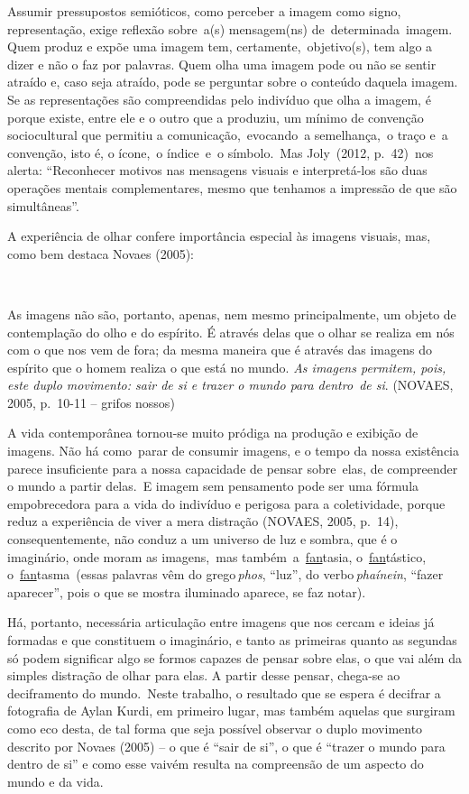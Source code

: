 \documentclass[
  letterpaper,
  a4paper,
  12pt]{scrbook}
\renewenvironment{quote}
  {\par\singlespacing\small\list{}{\rightmargin=0cm \leftmargin=4cm}%
   \item\relax}
  {\endlist}
\begin{document}
Assumir pressupostos semióticos, como perceber a imagem como signo,
representação, exige reflexão sobre~a(s) mensagem(ns)
de~determinada~imagem. Quem produz e expõe uma imagem tem,
certamente,~objetivo(s), tem algo a dizer e não o faz por palavras. Quem
olha uma imagem pode ou não se sentir atraído e, caso seja atraído, pode
se perguntar sobre o conteúdo daquela imagem. Se as representações são
compreendidas pelo indivíduo que olha a imagem, é porque existe, entre
ele e o outro que a produziu, um mínimo de convenção sociocultural que
permitiu a comunicação,~evocando~a semelhança,~o traço e~a convenção,
isto é, o ícone,~o índice~e~o símbolo.~Mas Joly~(2012, p.~42)~nos
alerta: ``Reconhecer motivos nas mensagens visuais e interpretá-los são
duas operações mentais complementares, mesmo que tenhamos a impressão de
que são simultâneas''.~

A experiência de olhar confere importância especial às imagens visuais,
mas, como bem destaca Novaes (2005):~

~

\begin{quote}
As imagens não são, portanto, apenas, nem mesmo principalmente, um
objeto de contemplação do olho e do espírito. É através delas que o
olhar se realiza em nós com o que nos vem de fora; da mesma maneira que
é através das imagens do espírito que o homem realiza o que está no
mundo. \emph{As imagens permitem, pois, este duplo movimento: sair de si
e trazer o mundo para dentro~de si}. (NOVAES, 2005, p.~10-11 -- grifos
nossos)~ ~
\end{quote}

A vida contemporânea tornou-se muito pródiga na produção e exibição de
imagens. Não há como~parar de consumir imagens, e o tempo da nossa
existência parece insuficiente para a nossa capacidade de pensar
sobre~elas, de compreender o mundo a partir delas.~E imagem sem
pensamento pode ser uma fórmula empobrecedora para a vida do indivíduo e
perigosa para a coletividade, porque reduz a experiência de viver a mera
distração (NOVAES, 2005, p.~14), consequentemente, não conduz a um
universo de luz e sombra, que é o imaginário, onde moram as imagens,~mas
também~a~\uline{fan}tasia, o~\uline{fan}tástico,
o~\uline{fan}tasma~(essas palavras vêm do grego\,\emph{phos}, ``luz'',
do verbo\,\emph{phaínein}, ``fazer aparecer'', pois o que se mostra
iluminado aparece, se faz notar).~

Há, portanto, necessária articulação entre imagens que nos cercam e
ideias já formadas e que constituem o imaginário, e tanto as primeiras
quanto as segundas só podem significar algo se formos capazes de pensar
sobre elas, o que vai além da simples distração de olhar para elas. A
partir desse pensar, chega-se ao deciframento do mundo.~Neste trabalho,
o resultado que se espera é decifrar a fotografia de Aylan Kurdi, em
primeiro lugar, mas também aquelas que surgiram como eco desta, de tal
forma que seja possível observar o duplo movimento descrito por Novaes
(2005) -- o que é ``sair de si'', o que é ``trazer o mundo para dentro
de si'' e como esse vaivém resulta na compreensão de um aspecto do mundo
e da vida.
\end{document}
